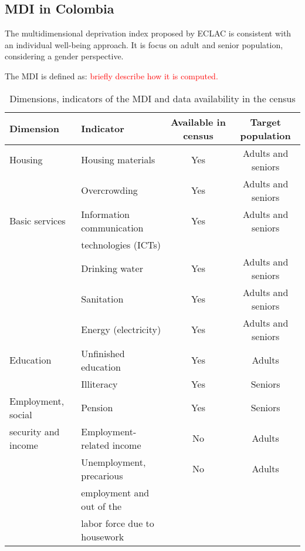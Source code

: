 \documentclass[a4paper, 11pt]{article}
\begin{document}
\subsection{MDI in Colombia}

The multidimensional deprivation index proposed by ECLAC is consistent with an individual well-being approach. It is focus on adult and senior population, considering a gender perspective.


The MDI is defined as: 
\textcolor{red}{briefly describe how it is computed.}


\begin{table}[ht]
\begin{center}
\small{
	\caption{Dimensions, indicators of the MDI and data availability in the census}
	\centering
		\begin{tabular}{llcc}
		\hline
				Dimension &Indicator&Available in census &Target population  \\
				\hline
	Housing &Housing materials & Yes & Adults and seniors\\
	& Overcrowding & Yes & Adults and seniors \\
			\hline
	Basic services &  Information communication & Yes & Adults and seniors \\
	 & technologies (ICTs) & &\\
	& Drinking water & Yes & Adults and seniors \\
	& Sanitation & Yes & Adults and seniors \\
	&Energy (electricity) & Yes & Adults and seniors \\
			\hline
	Education & Unfinished education & Yes &Adults \\
	             & Illiteracy& Yes & Seniors \\
	             		\hline
	  Employment, social  & Pension & Yes & Seniors \\
	  security and income & Employment-related income & No &Adults \\
	   & Unemployment, precarious  & No & Adults\\
	   & employment and out of the &&\\
	   &labor force due to housework&&\\
		

			\hline
	\end{tabular}
	}
	\end{center}
\end{table}
\end{document}
